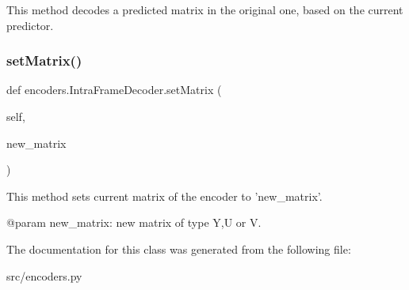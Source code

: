 \begin{DoxyVerb}This method decodes a predicted matrix in the original one, based on the current predictor.
\end{DoxyVerb}
 \mbox{\label{classencoders_1_1IntraFrameDecoder_af16e7a569f469d4b66ce3ca600136472}} 
\subsubsection{\texorpdfstring{set\+Matrix()}{setMatrix()}}
{\footnotesize\ttfamily def encoders.\+Intra\+Frame\+Decoder.\+set\+Matrix (\begin{DoxyParamCaption}\item[{}]{self,  }\item[{}]{new\+\_\+matrix }\end{DoxyParamCaption})}

\begin{DoxyVerb}This method sets current matrix of the encoder to 'new_matrix'.

@param new_matrix: new matrix of type Y,U or V.
\end{DoxyVerb}
 

The documentation for this class was generated from the following file\+:\begin{DoxyCompactItemize}
\item 
src/encoders.\+py\end{DoxyCompactItemize}
